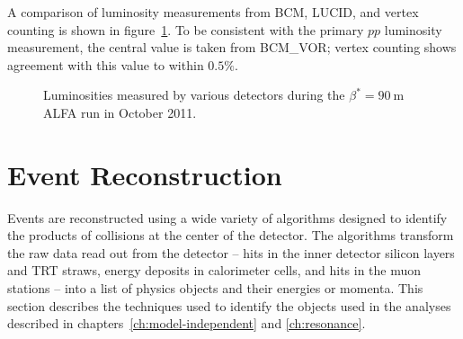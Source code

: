 A comparison of luminosity measurements from BCM, LUCID, and vertex counting is shown in figure~\ref{fig:reco-luminosity-alfa}. To be consistent with the primary $pp$ luminosity measurement, the central value is taken from BCM\_VOR; vertex counting shows agreement with this value to within $0.5\%$.

\begin{figure}[h]
	\centering
	\caption{Luminosities measured by various detectors during the $\beta^{*}=90~\mbox{m}$ ALFA run in October 2011.}
	\label{fig:reco-luminosity-alfa}
\end{figure}



\section{Event Reconstruction}\label{sec:event-reconstruction}
Events are reconstructed using a wide variety of algorithms designed to identify the products of collisions at the center of the detector. The algorithms transform the raw data read out from the detector -- hits in the inner detector silicon layers and TRT straws, energy deposits in calorimeter cells, and hits in the muon stations -- into a list of physics objects and their energies or momenta. This section describes the techniques used to identify the objects used in the analyses described in chapters~\ref{ch:model-independent} and \ref{ch:resonance}. 


